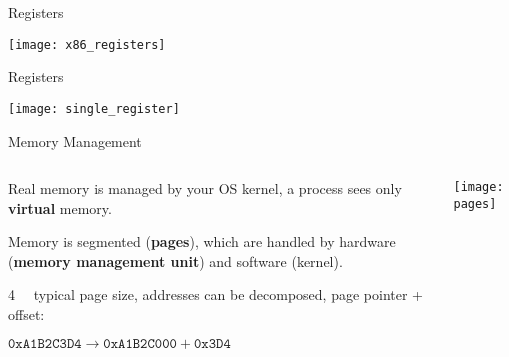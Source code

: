 \documentclass[beamer]{uibk}
\begin{document}
\begin{frame}{Registers}
    \begin{center}
        \texttt{[image: x86\_registers]}
    \end{center}
\end{frame}

\begin{frame}{Registers}
    \begin{center}
        \texttt{[image: single\_register]}
    \end{center}
\end{frame}

\begin{frame}{Memory Management}
    \begin{columns}
        \begin{column}{0.45\textwidth}
            Real memory is managed by your OS kernel, a process sees only
            \textbf{virtual} memory.

            \medskip

            Memory is segmented (\textbf{pages}), which are handled by hardware
            (\textbf{memory management unit}) and software (kernel).

            \medskip

            \SI{4}{\kibi\byte} typical page size, addresses can be decomposed,
            page pointer + offset:

            $\mathtt{0xA1B2C3D4} \to \texttt{0xA1B2C000} + \mathtt{0x3D4}$
        \end{column}
        \begin{column}{0.55\textwidth}
            \texttt{[image: pages]}
        \end{column}
    \end{columns}
\end{frame}
\end{document}
